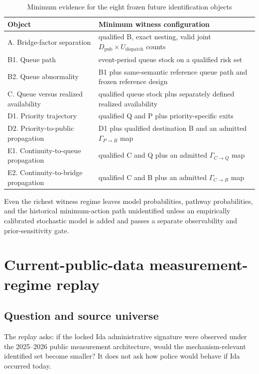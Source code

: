 \documentclass[11pt]{article}
\begin{document}
\begin{table}[H]
\centering
\caption{Minimum evidence for the eight frozen future identification objects}
\label{tab:witnesses}
\begin{tabularx}{\textwidth}{@{}l X@{}}
\toprule
Object & Minimum witness configuration \\
\midrule
A. Bridge-factor separation & qualified B, exact nesting, valid joint $D_{\mathrm{pub}}\times U_{\mathrm{dispatch}}$ counts \\
B1. Queue path & event-period queue stock on a qualified risk set \\
B2. Queue abnormality & B1 plus same-semantic reference queue path and frozen reference design \\
C. Queue versus realized availability & qualified queue stock plus separately defined realized availability \\
D1. Priority trajectory & qualified Q and P plus priority-specific exits \\
D2. Priority-to-public propagation & D1 plus qualified destination B and an admitted $\Gamma_{P\to B}$ map \\
E1. Continuity-to-queue propagation & qualified C and Q plus an admitted $\Gamma_{C\to Q}$ map \\
E2. Continuity-to-bridge propagation & qualified C and B plus an admitted $\Gamma_{C\to B}$ map \\
\bottomrule
\end{tabularx}
\end{table}

Even the richest witness regime leaves model probabilities, pathway probabilities, and the historical minimum-action path unidentified unless an empirically calibrated stochastic model is added and passes a separate observability and prior-sensitivity gate.

\section{Current-public-data measurement-regime replay}
\label{sec:m8p}

\subsection{Question and source universe}

The replay asks: if the locked Ida administrative signature were observed under the 2025--2026 public measurement architecture, would the mechanism-relevant identified set become smaller? It does not ask how police would behave if Ida occurred today.
\end{document}

